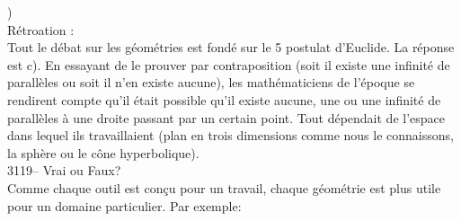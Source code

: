 \documentclass[letterpaper, 12pt]{article}
\begin{document}
)\\

R\'etroation :\\
Tout le d\'ebat sur les g\'eom\'etries est fond\'e sur le 5\ieme{} postulat d'Euclide. La r\'eponse est c). En essayant de le prouver par contraposition (soit il existe une infinit\'e de parall\`eles ou soit il n'en existe aucune), les math\'ematiciens de l'\'epoque se rendirent compte qu'il \'etait possible qu'il existe aucune, une ou une infinit\'e de parall\`eles \`a une droite passant par un certain point. Tout d\'ependait de l'espace dans lequel ils travaillaient (plan en trois dimensions comme nous le connaissons, la sph\`ere ou le c\^one hyperbolique).\\



3119-- Vrai ou Faux?\\
Comme chaque outil est con\c cu pour un travail, chaque g\'eom\'etrie est plus utile pour un domaine particulier. Par exemple:
\end{document}
